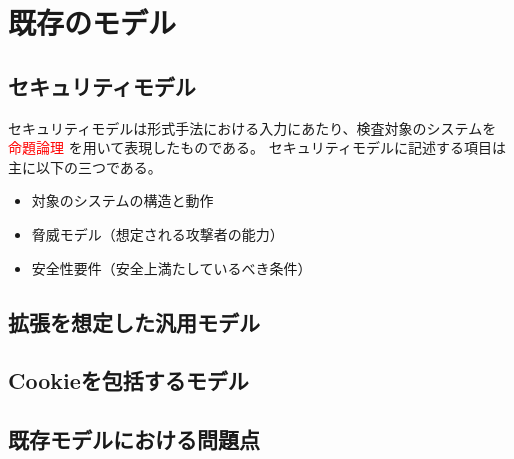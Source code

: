 \documentclass[12pt,a4paper]{jbook}
\begin{document}
\chapter{既存のモデル}
\section{セキュリティモデル}
\label{sec:SecurityModel}
セキュリティモデルは形式手法における入力にあたり、検査対象のシステムを\textcolor{red}{
命題論理
}
を用いて表現したものである。
セキュリティモデルに記述する項目は主に以下の三つである。
\begin{itemize}
\item 対象のシステムの構造と動作
\item 脅威モデル（想定される攻撃者の能力）
\item 安全性要件（安全上満たしているべき条件）
\end{itemize}
\section{拡張を想定した汎用モデル}

\section{Cookieを包括するモデル}

\section{既存モデルにおける問題点}
\end{document}
